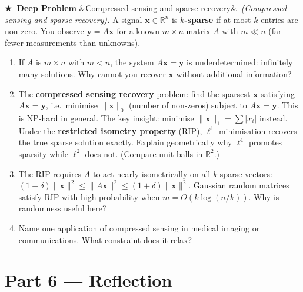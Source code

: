\documentclass[12pt,a4paper]{article}
\newcounter{problem}
\newcounter{deepproblem}
\newenvironment{deepproblem}[1][]{\refstepcounter{deepproblem}\par\vspace{6pt}\noindent\textbf{\color{NavyBlue}$\bigstar$\ Deep Problem \thedeepproblem}\ifx&#1&\else\ \textit{(#1)}\fi\textbf{.}\enskip}{\par\vspace{4pt}}
\begin{document}
\begin{deepproblem}[Compressed sensing and sparse recovery]
A signal $\mathbf{x}\in\mathbb{R}^n$ is \textbf{$k$-sparse} if at most $k$ entries are non-zero. You observe $\mathbf{y}=A\mathbf{x}$ for a known $m\times n$ matrix $A$ with $m\ll n$ (far fewer measurements than unknowns).
\begin{enumerate}[label=(\alph*)]
  \item If $A$ is $m\times n$ with $m<n$, the system $A\mathbf{x}=\mathbf{y}$ is underdetermined: infinitely many solutions. Why cannot you recover $\mathbf{x}$ without additional information?
  \item The \textbf{compressed sensing recovery} problem: find the sparsest $\mathbf{x}$ satisfying $A\mathbf{x}=\mathbf{y}$, i.e.\ minimise $\|\mathbf{x}\|_0$ (number of non-zeros) subject to $A\mathbf{x}=\mathbf{y}$. This is NP-hard in general. The key insight: minimise $\|\mathbf{x}\|_1=\sum|x_i|$ instead. Under the \textbf{restricted isometry property} (RIP), $\ell^1$ minimisation recovers the true sparse solution exactly. Explain geometrically why $\ell^1$ promotes sparsity while $\ell^2$ does not. (Compare unit balls in $\mathbb{R}^2$.)
  \item The RIP requires $A$ to act nearly isometrically on all $k$-sparse vectors: $(1-\delta)\|\mathbf{x}\|^2\leq\|A\mathbf{x}\|^2\leq(1+\delta)\|\mathbf{x}\|^2$. Gaussian random matrices satisfy RIP with high probability when $m=O(k\log(n/k))$. Why is randomness useful here?
  \item Name one application of compressed sensing in medical imaging or communications. What constraint does it relax?
\end{enumerate}
\end{deepproblem}

\section{Part 6 \texorpdfstring{---}{--} Reflection}
\end{document}
